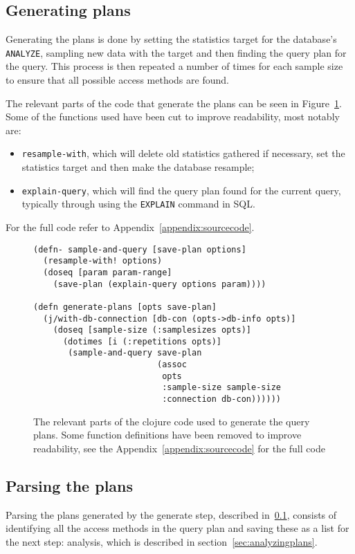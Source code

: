 \subsection{Generating plans}\label{sec:generatingplans}
Generating the plans is done by setting the statistics target for the database's
\texttt{ANALYZE}, sampling new data with the target and then finding the query plan for
the query. This process is then repeated a number of times for each sample size
to ensure that all possible access methods are found.

The relevant parts of the code that generate the plans can be seen in
Figure~\ref{fig:clj:generating}. Some of the functions used have been cut to
improve readability, most notably are:
\begin{itemize}
\item \texttt{resample-with}, which will delete old statistics gathered if necessary, set
  the statistics target and then make the database resample;
\item \texttt{explain-query}, which will find the query plan found for the current query,
  typically through using the \texttt{EXPLAIN} command in SQL.
\end{itemize}
For the full code refer to Appendix~\ref{appendix:sourcecode}.

\begin{figure}[ht]
  \begin{verbatim}
(defn- sample-and-query [save-plan options]
  (resample-with! options)
  (doseq [param param-range]
    (save-plan (explain-query options param))))

(defn generate-plans [opts save-plan]
  (j/with-db-connection [db-con (opts->db-info opts)]
    (doseq [sample-size (:samplesizes opts)]
      (dotimes [i (:repetitions opts)]
       (sample-and-query save-plan
                         (assoc
                          opts
                          :sample-size sample-size
                          :connection db-con))))))
   \end{verbatim}
   \caption[The clojure code to generate a query]{The relevant parts of the
     clojure code used to generate the query plans. Some function definitions
     have been removed to improve readability, see the
     Appendix~\ref{appendix:sourcecode} for the full code}
\label{fig:clj:generating}
\end{figure}

\subsection{Parsing the plans}\label{sec:parsing}
Parsing the plans generated by the generate step, described
in~\ref{sec:generatingplans}, consists of identifying all the access
methods in the query plan and saving these as a list for the next step:
analysis, which is described in section~\ref{sec:analyzingplans}.


